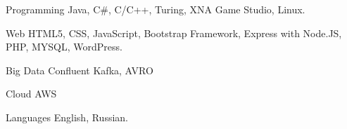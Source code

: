 


\begin{cvskills}


\cvskill
{Programming} %
{Java, C\#, C/C++, Turing, XNA Game Studio, Linux.} %


\cvskill
{Web} %
{HTML5, CSS, JavaScript, Bootstrap Framework, Express with Node.JS, PHP, MYSQL, WordPress.} %


\cvskill
{Big Data} %
{Confluent Kafka, AVRO} %

\cvskill
{Cloud} %
{AWS} %

\cvskill
{Languages} %
{English, Russian.} %


\end{cvskills}